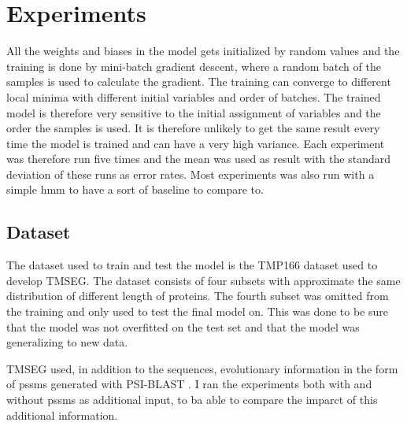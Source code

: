 \section{Experiments}
	

	


All the weights and biases in the model gets initialized by random values and the training
is done by mini-batch gradient descent, where a random batch of the samples is used to 
calculate the gradient. The training can converge to different local minima with 
different initial variables and order of batches.
The trained model is therefore very sensitive to the initial assignment of 
variables and the order the samples is used. It is therefore unlikely to get the same 
result every time the model is trained and can have a very high variance. 
Each experiment was therefore run five times and the mean was used as result with 
the standard deviation of these runs as error rates.
Most experiments was also run with a simple \gls{hmm} to have a sort of baseline
to compare to.

\subsection{Dataset}
The dataset used to train and test the model is the TMP166\cite{tmseg} dataset used to 
develop TMSEG. The dataset consists of four subsets with approximate the same distribution 
of different length of proteins. The fourth subset was omitted from the training and only 
used to test the final model on. This was done to be sure that the model was not overfitted
on the test set and that the model was generalizing to new data. 

TMSEG used, in addition to the sequences, evolutionary information in 
the form of \glspl{pssm} generated with 
PSI-BLAST \cite{psi-blast}. I ran the experiments both with and without \glspl{pssm}
as additional input, to ba able to compare the imparct of this additional information.

